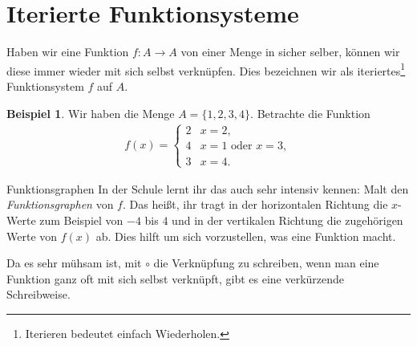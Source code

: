 \documentclass[a4paper,ngerman,12pt]{zirkelblatt1415}
\theoremstyle{definition}
\newtheorem{beispiel}[definition]{Beispiel}
\theoremstyle{remark}
\begin{document}






\section{Iterierte Funktionsysteme}

Haben wir eine Funktion $f:A\longrightarrow A$ von einer Menge in sicher selber, können wir diese immer wieder mit sich selbst verknüpfen. 
Dies bezeichnen wir als iteriertes\footnote{Iterieren bedeutet einfach Wiederholen.} Funktionsystem $f$ auf $A$.

\begin{beispiel}
\label{bsp11}
Wir haben die Menge $A=\{1,2,3,4 \}$. Betrachte die Funktion
\begin{align}
f(x)=\begin{cases}
2 & x=2, \\
4 & x=1 \text{ oder }x=3, \\
3 & x=4.
\end{cases} \label{beispiel}
\end{align}
\end{beispiel}



\begin{aufgabe}{Funktionsgraphen}
  In der Schule lernt ihr das auch sehr intensiv kennen: Malt den \emph{Funktionsgraphen} von $f$. 
  Das heißt, ihr tragt in der horizontalen Richtung die $x$-Werte zum Beispiel von $-4$ bis $4$ und in der vertikalen Richtung die zugehörigen Werte von $f(x)$ ab. 
  Dies hilft um sich vorzustellen, was eine Funktion macht.
\end{aufgabe}

Da es sehr mühsam ist, mit $\circ$ die Verknüpfung zu schreiben, wenn man eine Funktion ganz oft mit sich selbst verknüpft, 
gibt es eine verkürzende Schreibweise.
\end{document}
